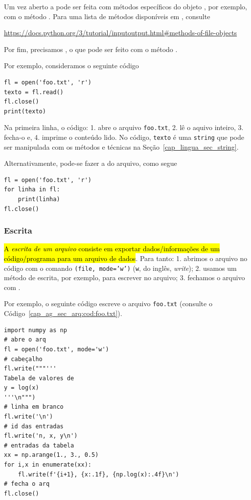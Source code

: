 Um vez aberto a  pode ser feita com métodos específicos do objeto {\PYTHONfile}, por exemplo, com o método {\PYTHONfileDOTread}. Para uma lista de métodos disponíveis em {\python}, consulte
\begin{center}
  \url{https://docs.python.org/3/tutorial/inputoutput.html#methods-of-file-objects}
\end{center}
Por fim, precisamos , o que pode ser feito com o método {\PYTHONfileDOTclose}.

Por exemplo, consideramos o seguinte código

\begin{lstlisting}
fl = open('foo.txt', 'r')
texto = fl.read()
fl.close()
print(texto)
\end{lstlisting}

Na primeira linha, o código: 1. abre o arquivo \texttt{foo.txt}, 2. lê o aquivo inteiro, 3. fecha-o e, 4. imprime o conteúdo lido. No código, \texttt{texto} é uma \texttt{string} que pode ser manipulada com os métodos e técnicas na Seção~\ref{cap_lingua_sec_string}.

Alternativamente, pode-se fazer a  do arquivo, como segue

\begin{lstlisting}
fl = open('foo.txt', 'r')
for linha in fl:
    print(linha)
fl.close()
\end{lstlisting}

\subsubsection{Escrita}

\hl{A \emph{escrita de um arquivo} consiste em exportar dados/informações de um código/programa para um arquivo de dados}. Para tanto: 1. abrimos o arquivo no código com o comando {\PYTHONopen}\texttt{(file, mode='w')} (\texttt{w}, do inglês, \textit{write}); 2. usamos um método de escrita, por exemplo, {\PYTHONfileDOTwrite} para escrever no arquivo; 3. fechamos o arquivo com {\PYTHONfileDOTclose}.

Por exemplo, o seguinte código escreve o arquivo \texttt{foo.txt} (consulte o Código~\ref{cap_ag_sec_arq:cod:foo.txt}).

\begin{lstlisting}[caption=foo.py, label=cap_ag_sec_arq:cod:foo.py]
import numpy as np
# abre o arq
fl = open('foo.txt', mode='w')
# cabeçalho
fl.write("""'''
Tabela de valores de
y = log(x)
'''\n""")
# linha em branco
fl.write('\n')
# id das entradas
fl.write('n, x, y\n')
# entradas da tabela
xx = np.arange(1., 3., 0.5)
for i,x in enumerate(xx):
    fl.write(f'{i+1}, {x:.1f}, {np.log(x):.4f}\n')
# fecha o arq
fl.close()
\end{lstlisting}

